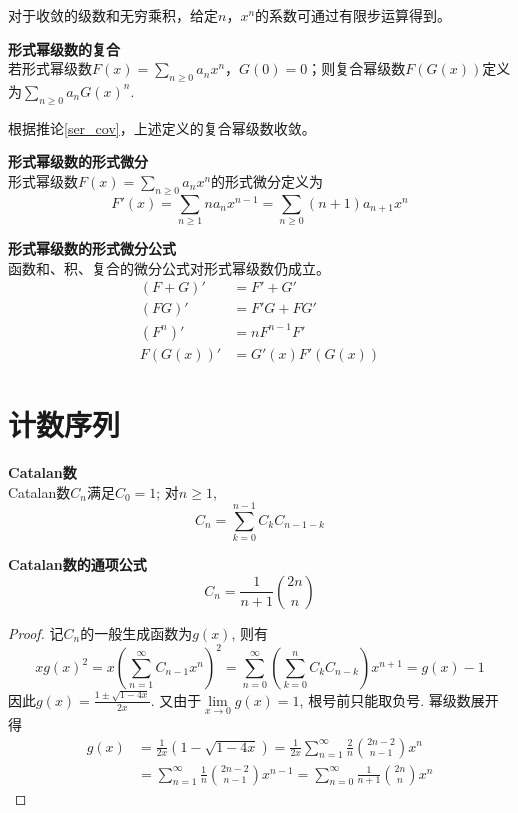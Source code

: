 \par 对于收敛的级数和无穷乘积，给定$n$，$x^n$的系数可通过有限步运算得到。

\begin{dfn} 
\textbf{形式幂级数的复合}\\
若形式幂级数$F(x)=\sum_{n\ge 0} a_nx^n$，$G(0)=0$；则复合幂级数$F(G(x))$定义为$\sum_{n\ge 0} a_nG(x)^n$.
\end{dfn}
根据推论\ref{ser_cov}，上述定义的复合幂级数收敛。

\begin{dfn} 
\textbf{形式幂级数的形式微分}\\
形式幂级数$F(x)=\sum_{n\ge 0} a_nx^n$的形式微分定义为
\begin{equation}
    F'(x)=\sum_{n\ge 1} na_nx^{n-1}=\sum_{n\ge 0} (n+1)a_{n+1}x^n
\end{equation}
\end{dfn}

\begin{pro}
\textbf{形式幂级数的形式微分公式}\\
函数和、积、复合的微分公式对形式幂级数仍成立。
\begin{align}
    (F+G)' &= F'+G'\\
    (FG)' &= F'G +FG'\\
    (F^n)' &= nF^{n-1}F'\\
    F(G(x))'&= G'(x)F'(G(x))
\end{align}
\end{pro}

\section{计数序列}
\begin{dfn} \textbf{Catalan数}\\
Catalan数$C_n$满足$C_0=1$; 对$n\ge 1$, 
\begin{equation}
    C_n = \sum_{k=0}^{n-1} C_kC_{n-1-k}
\end{equation}
\end{dfn}

\begin{pro}\textbf{Catalan数的通项公式}\\
\begin{equation}
    C_n = \frac{1}{n+1}\binom{2n}{n}
\end{equation}
\end{pro}
\begin{proof}
记$C_{n}$的一般生成函数为$g(x)$, 则有
\begin{equation}
    xg(x)^2 = x\left(\sum_{n=1}^\infty C_{n-1}x^n\right)^2 = \sum_{n=0}^\infty \left(\sum_{k=0}^{n} C_kC_{n-k}\right) x^{n+1}=g(x)-1
\end{equation}
因此$g(x)=\frac{1\pm \sqrt{1-4x}}{2x}$. 又由于$\lim\limits_{x\to 0} g(x) = 1$, 根号前只能取负号. 幂级数展开得
\begin{align*}
g(x)&=\frac{1}{2x}(1-\sqrt{1-4x})= \frac{1}{2x}\sum_{n=1}^\infty \frac{2}{n}\binom{2n-2}{n-1}x^n\\
&= \sum_{n=1}^\infty \frac{1}{n}\binom{2n-2}{n-1}x^{n-1} = \sum_{n=0}^\infty \frac{1}{n+1}\binom{2n}{n}x^{n}
\end{align*}
\end{proof}

